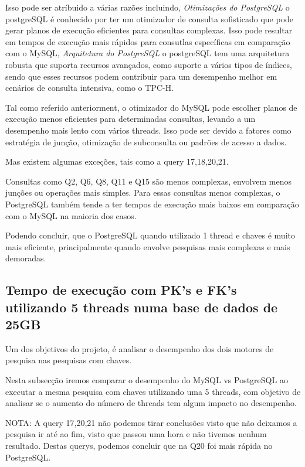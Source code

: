\documentclass{article}
\begin{document}
Isso pode ser atríbuido a várias razões incluindo, \textit{Otimizações do PostgreSQL} o postgreSQL é conhecido por ter um otimizador de consulta sofisticado que pode gerar planos de execução eficientes para consultas complexas. Isso pode resultar em tempos de execução mais rápidos para consutlas específicas em comparação com o MySQL, \textit{Arquitetura do PostgreSQL} o postgreSQL tem uma arquitetura robusta que suporta recursos avançados, como suporte a vários tipos de índices, sendo que esses recursos podem contribuir para um desempenho melhor em cenários de consulta intensiva, como o TPC-H.

Tal como referido anteriorment, o otimizador do MySQL pode escolher planos de execução menos eficientes para determinadas consultas, levando a um desempenho mais lento com vários threads. Isso pode ser devido a fatores como estratégia de junção, otimização de subconsulta ou padrões de acesso a dados. 


\texttt{}\par Mas existem algumas exceções, tais como a query 17,18,20,21.

Consultas como Q2, Q6, Q8, Q11 e Q15 são menos complexas, envolvem menos junções ou operações mais simples.
Para essas consultas menos complexas, o PostgreSQL também tende a ter tempos de execução mais baixos em comparação com o MySQL na maioria dos casos.

Podendo concluir, que o PostgreSQL quando utilizado 1 thread e chaves é muito mais eficiente, principalmente quando envolve pesquisas mais complexas e mais demoradas.

\clearpage
\subsection{Tempo de execução com PK's e FK's utilizando 5 threads numa base
de dados de 25GB}

\texttt{}\par Um dos objetivos do projeto, é analisar o desempenho dos dois motores de pesquisa nas pesquisas com chaves.

Nesta subsecção iremos comparar o desempenho do MySQL vs PostgreSQL ao executar a mesma pesquisa com chaves utilizando uma 5 threads, com objetivo de analisar se o aumento do número de threads tem algum impacto no desempenho.


NOTA: A query 17,20,21 não podemos tirar conclusões visto que não deixamos a pesquisa ir até ao fim, visto que passou uma hora e não tivemos nenhum resultado. Destas querys, podemos concluir que na Q20 foi mais rápida no PostgreSQL.
\end{document}
